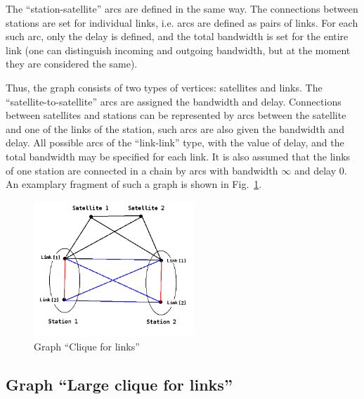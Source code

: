 \documentclass{ifacconf}
\begin{document}
The ``station-satellite'' arcs are defined in the same way. The connections between
stations are set for individual links, i.e. arcs are defined
as pairs of links. For each such arc, only the delay is defined, and
the total bandwidth is set for the entire link (one can distinguish
incoming and outgoing bandwidth, but at the moment they are considered the same).

Thus, the graph consists of two types of vertices: satellites and
links. The ``satellite-to-satellite'' arcs are assigned the bandwidth and delay. Connections between
satellites and stations can be represented by arcs between the satellite and one of the 
links of the station, such arcs are also given the bandwidth and delay. All possible arcs of the 
``link-link'' type, with the value of delay, and the total bandwidth may be specified
for each link. It is also assumed that the links of one station are
connected in a chain by arcs with bandwidth $\infty$ and delay 0.
An examplary fragment of such a graph is shown in Fig.~\ref{fig:original_graph}.

\begin{figure}
\begin{center}
\includegraphics[width=6cm]{original_graph.png}
 \caption{\label{fig:original_graph} Graph ``Clique for links''}
\end{center}
\end{figure}



\subsection{Graph ``Large clique for links''} \label{subsec:clique}
\end{document}
